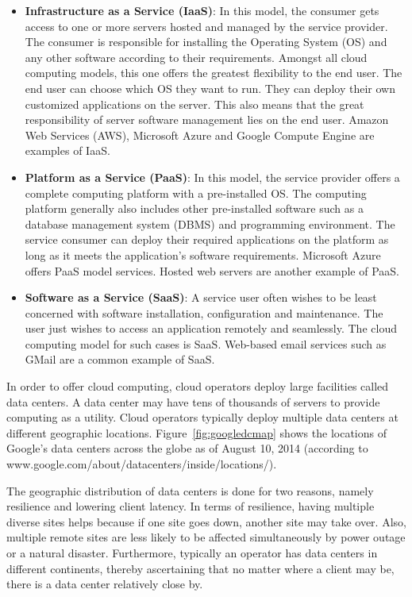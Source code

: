 \begin{itemize}
\item \textbf{Infrastructure as a Service (IaaS)}: In this model, the consumer gets access to one or more servers hosted and managed by the service provider. The consumer is responsible for installing the Operating System (OS) and any other software according to their requirements. Amongst all cloud computing models, this one offers the greatest flexibility to the end user. The end user can choose which OS they want to run. They can deploy their own customized applications on the server. This also means that the great responsibility of server software management lies on the end user. Amazon Web Services (AWS), Microsoft Azure and Google Compute Engine are examples of IaaS.
\item \textbf{Platform as a Service (PaaS)}: In this model, the service provider offers a complete computing platform with a pre-installed OS. The computing platform generally also includes other pre-installed software such as a database management system (DBMS) and programming environment. The service consumer can deploy their required applications on the platform as long as it meets the application's software requirements. Microsoft Azure offers PaaS model services. Hosted web servers are another example of PaaS.
\item \textbf{Software as a Service (SaaS)}: A service user often wishes to be least concerned with software installation, configuration and maintenance. The user just wishes to access an application remotely and seamlessly. The cloud computing model for such cases is SaaS. Web-based email services such as GMail are a common example of SaaS.
\end{itemize}

In order to offer cloud computing, cloud operators deploy large facilities called data centers. A data center may have tens of thousands of servers to provide computing as a utility. Cloud operators typically deploy multiple data centers at different geographic locations. Figure~\ref{fig:googledcmap} shows the locations of Google's data centers across the globe  as of August 10, 2014 (according to www.google.com/about/datacenters/inside/locations/).

The geographic distribution of data centers is done for two reasons, namely resilience and lowering client latency. In terms of resilience, having multiple diverse sites helps because if one site goes down, another site may take over. Also, multiple remote sites are less likely to be affected simultaneously by power outage or a natural disaster. Furthermore, typically an operator has data centers in different continents, thereby ascertaining that no matter where a client may be, there is a data center relatively close by.

